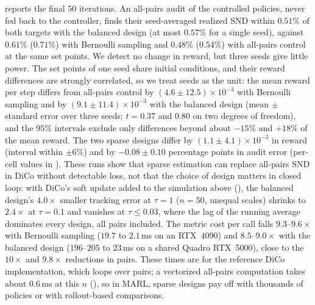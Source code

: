 \documentclass[twoside,11pt]{article}
\begin{document}
 reports the final $50$ iterations. An all-pairs audit of
the controlled policies, never fed back to the controller, finds their
seed-averaged realized SND within $0.51\%$ of both targets with the
balanced design (at most $0.57\%$ for a single seed), against $0.61\%$
($0.71\%$) with Bernoulli sampling and $0.48\%$ ($0.54\%$) with all-pairs
control at the same set points. We
detect no change in reward, but three seeds give little power. The set
points of one seed share initial conditions, and their reward differences
are strongly correlated, so we treat seeds as the unit: the mean reward per
step differs from all-pairs control by $(4.6\pm12.5)\times10^{-3}$ with
Bernoulli sampling and by $(9.1\pm11.4)\times10^{-3}$ with the balanced
design (mean $\pm$ standard error over three seeds; $t=0.37$ and $0.80$ on
two degrees of freedom), and the $95\%$ intervals exclude only differences
beyond about $-15\%$ and $+18\%$ of the mean reward. The two sparse designs
differ by $(1.1\pm4.1)\times10^{-3}$ in reward (interval within $\pm6\%$)
and by $-0.08\pm0.10$ percentage points in audit error
(per-cell values in ). These runs show that sparse estimation can replace all-pairs SND in DiCo
without detectable loss, not that the choice of design matters in closed
loop: with DiCo's soft update added to the simulation above
(), the balanced design's $4.0\times$ smaller tracking error at
$\tau=1$ ($n=50$, unequal scales) shrinks to $2.4\times$ at $\tau=0.1$ and
vanishes at $\tau\le0.03$, where the lag of the running average dominates
every design, all pairs included. The
metric cost per call falls $9.3$--$9.6\times$ with Bernoulli sampling
($19.7$ to $2.1$\,ms on an RTX~4090) and $8.5$--$9.0\times$ with the
balanced design (\mbox{$196$--$205$} to $23$\,ms on a shared Quadro RTX~5000),
close to the $10\times$ and $9.8\times$ reductions in pairs. These times are for
the reference DiCo implementation, which loops over pairs; a vectorized
all-pairs computation takes about $0.6$\,ms at this $n$ (),
so in MARL, sparse designs pay off with thousands of policies or with
rollout-based comparisons.
\end{document}

